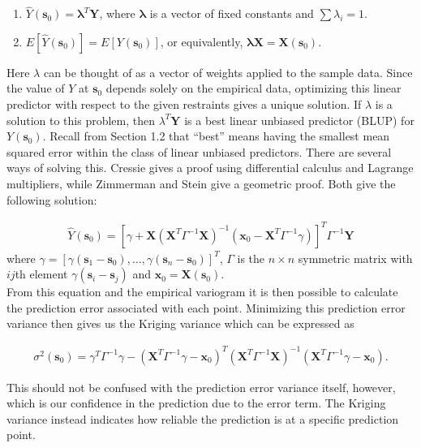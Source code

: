 \documentclass[12pt,twoside]{reedthesis}
\begin{document}
\begin{enumerate}
\item $\hat Y(\mathbf{s}_0) = \boldsymbol{\lambda}^T\mathbf{Y}$, where $\boldsymbol{\lambda}$ is a vector of fixed constants and $\sum \lambda_i = 1$. 
\item $E[\hat Y(\mathbf{s}_0)] = E[Y(\mathbf{s}_0)]$, or equivalently, $\boldsymbol{\lambda}\mathbf{X} = \mathbf{X}(\mathbf{s}_0)$.
\end{enumerate}

Here $\lambda$ can be thought of as a vector of weights applied to the sample data. Since the value of $Y$ at $\mathbf{s}_0$ depends solely on the empirical data, optimizing this linear predictor with respect to the given restraints gives a unique solution. If $\lambda$ is a solution to this problem, then $\lambda^T\mathbf{Y}$ is a best linear unbiased predictor (BLUP) for $Y(\mathbf{s}_0)$. Recall from Section 1.2 that ``best'' means having the smallest mean squared error within the class of linear unbiased predictors. There are several ways of solving this. Cressie \cite{cressie:1993} gives a proof using differential calculus and Lagrange multipliers, while Zimmerman and Stein \cite{gelfand:2010} give a geometric proof. Both give the following solution:

\begin{align*}
\hat Y(\mathbf{s}_0) = [\gamma + \mathbf{X}(\mathbf{X}^T\Gamma^{-1}\mathbf{X})^{-1}(\mathbf{x}_0 - \mathbf{X}^T\Gamma^{-1}\gamma)]^T\Gamma^{-1}\mathbf{Y}
\end{align*}
where $\gamma = [\gamma(\mathbf{s}_1 - \mathbf{s}_0), \dots, \gamma(\mathbf{s}_n - \mathbf{s}_0)]^T$, $\Gamma$ is the $n \times n$ symmetric matrix with $ij$th element $\gamma(\mathbf{s}_i - \mathbf{s}_j)$ and $\mathbf{x}_0 = \mathbf{X}(\mathbf{s}_0)$. \\

From this equation and the empirical variogram it is then possible to calculate the prediction error associated with each point. Minimizing this prediction error variance then gives us the Kriging variance which can be expressed as

\begin{align*}
\sigma^2(\mathbf{s}_0) = \gamma^T\Gamma^{-1}\gamma - (\mathbf{X}^T\Gamma^{-1}\gamma - \mathbf{x}_0)^T(\mathbf{X}^T\Gamma^{-1}\mathbf{X})^{-1}(\mathbf{X}^T\Gamma^{-1}\gamma - \mathbf{x}_0).
\end{align*}

This should not be confused with the prediction error variance itself, however, which is our confidence in the prediction due to the error term. The Kriging variance instead indicates how reliable the prediction is at a specific prediction point.
\end{document}
